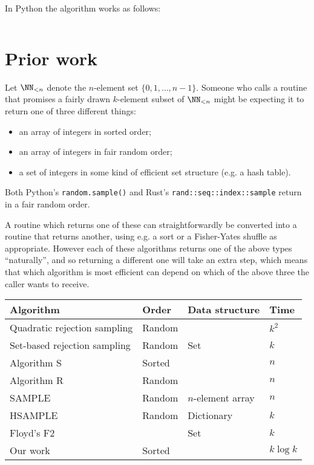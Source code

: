 \documentclass[letterpaper,luatex,11pt]{article}
\begin{document}
In Python the algorithm works as follows:

\inputminted{Python}{code/cardchoose.py}

\section{Prior work}\label{priorwork}
Let \(\NN_{<n}\) denote the \(n\)-element set \(\{0, 1, \ldots, n-1\}\). Someone who calls a routine that promises a fairly drawn \(k\)-element subset of
\(\NN_{<n}\) might be expecting it to return one of three different things:

\begin{itemize}
    \item an array of integers in sorted order;
    \item an array of integers in fair random order;
    \item a set of integers in some kind of efficient set structure (e.g. a hash table).
\end{itemize}

Both Python's \texttt{random.sample()} and 
Rust's \texttt{rand::seq::index::sample} return in a fair random order.

A routine which returns one of these can straightforwardly be converted into 
a routine that returns another, using e.g. a sort or a Fisher-Yates shuffle as appropriate.
However each of these algorithms returns one of the above types ``naturally'', and
so returning a different one will take an extra step, which means that which algorithm
is most efficient can depend on which of the above three the caller wants to receive.

\begin{center}
    \begin{tabular}{l|l|l|l}
    Algorithm & Order & Data structure & Time \\
    \hline
    Quadratic rejection sampling & Random &  & \(k^2\) \\
    Set-based rejection sampling & Random & Set & \(k\) \\
    Algorithm S & Sorted &  & \(n\) \\
    Algorithm R & Random &  & \(n\) \\
    SAMPLE & Random & \(n\)-element array & \(n\) \\
    HSAMPLE & Random & Dictionary & \(k\) \\
    Floyd's F2 &  & Set & \(k\) \\
    Our work & Sorted &  & \(k \log k\)
    \end{tabular}
\end{center}
\end{document}
